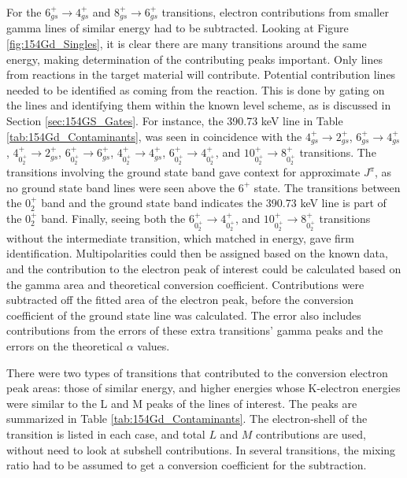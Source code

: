For the $6_{gs}^+\rightarrow 4_{gs}^+$ and $8_{gs}^+\rightarrow 6_{gs}^+$ transitions, electron contributions from smaller gamma lines of similar energy had to be subtracted. Looking at Figure \ref{fig:154Gd_Singles}, it is clear there are many transitions around the same energy, making determination of the contributing peaks important. Only lines from reactions in the target material will contribute. Potential contribution lines needed to be identified as coming from the reaction. This is done by gating on the lines and identifying them within the known level scheme,  as is discussed in Section \ref{sec:154GS_Gates}. For instance, the 390.73 keV line in Table \ref{tab:154Gd_Contaminants}, was seen in coincidence with the $4^+_{gs}\rightarrow2^+_{gs}$, $6^+_{gs}\rightarrow4^+_{gs}$, $4^+_{0^+_{2}}\rightarrow2^+_{gs}$, $6^+_{0^+_{2}}\rightarrow6^+_{gs}$, $4^+_{0^+_{2}}\rightarrow4^+_{gs}$, $6^+_{0^+_{2}}\rightarrow4^+_{0^+_{2}}$, and $10^+_{0^+_{2}}\rightarrow8^+_{0^+_{2}}$ transitions. The transitions involving the ground state band gave context for approximate $J^{\pi}$, as no ground state band lines were seen above the $6^+$ state.  The transitions between the $0^+_{2}$ band and the ground state band indicates the 390.73 keV line is part of the $0^+_{2}$ band. Finally, seeing both the $6^+_{0^+_{2}}\rightarrow4^+_{0^+_{2}}$, and $10^+_{0^+_{2}}\rightarrow8^+_{0^+_{2}}$ transitions without the intermediate transition, which matched in energy, gave firm identification. Multipolarities could then be assigned based on the known data, and the contribution to the electron peak of interest could be calculated based on the gamma area and theoretical conversion coefficient. Contributions were subtracted off the fitted area of the electron peak, before the conversion coefficient of the ground state line was calculated. The error also includes contributions from the errors of these extra transitions' gamma peaks and the errors on the theoretical $\alpha$ values. 

There were two types of transitions that contributed to the conversion electron peak areas: those of similar energy, and higher energies whose K-electron energies were similar to the L and M peaks of the lines of interest. The peaks are summarized in Table \ref{tab:154Gd_Contaminants}. The electron-shell of the transition is listed in each case, and total $L$ and $M$ contributions are used, without need to look at subshell contributions.  In several transitions, the mixing ratio had to be assumed to get a conversion coefficient for the subtraction.

